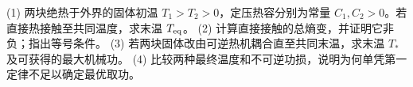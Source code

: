 (1) 两块绝热于外界的固体初温 \(T_1>T_2>0\)，定压热容分别为常量 \(C_1,C_2>0\)。若直接热接触至共同温度，求末温 \(T_{\rm eq}\)。
(2) 计算直接接触的总熵变，并证明它非负；指出等号条件。
(3) 若两块固体改由可逆热机耦合直至共同末温，求末温 \(T_*\) 及可获得的最大机械功。
(4) 比较两种最终温度和不可逆功损，说明为何单凭第一定律不足以确定最优取功。
